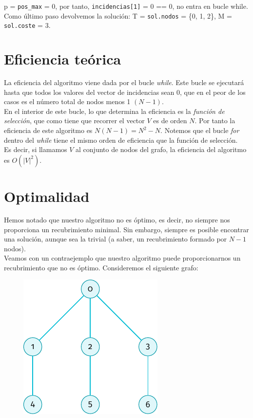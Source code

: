 \documentclass[11pt]{article}
\begin{document}
 p = \verb|pos_max| = 0, por tanto, \verb|incidencias[1]| = 0 == 0, no entra en bucle while. Como último paso devolvemos la solución:  T  = \verb|sol.nodos| = \{0, 1, 2\}, M = \verb|sol.coste| = 3.
 
\section*{Eficiencia teórica}
La eficiencia del algoritmo viene dada por el bucle \textit{while}. Este bucle se ejecutará hasta que todos los valores del vector de incidencias sean $0$, que en el peor de los casos es el número total de nodos menos 1 $(N - 1)$.\\

En el interior de este bucle, lo que determina la eficiencia es la \textit{función de selección}, que como tiene que recorrer el vector $V$ es de orden $N$. Por tanto la eficiencia de este algoritmo es $N(N-1) = N^2 - N$. Notemos que el bucle \textit{for} dentro del \textit{while} tiene el mismo orden de eficiencia que la función de selección.\\

Es decir, si llamamos $V$ al conjunto de nodos del grafo, la eficiencia del algoritmo es $O(|V|^2)$.

\section*{Optimalidad}

Hemos notado que nuestro algoritmo no es óptimo, es decir, no siempre nos proporciona un recubrimiento minimal. Sin embargo, siempre es posible encontrar una solución, aunque sea la trivial (a saber, un recubrimiento formado por $N-1$ nodos).\\

Veamos con un contraejemplo que nuestro algoritmo puede proporcionarnos un recubrimiento que no es óptimo. Consideremos el siguiente grafo:

\begin{figure}[H]
	\centering \includegraphics{./img/grafo2.pdf}
\end{figure}
\end{document}
